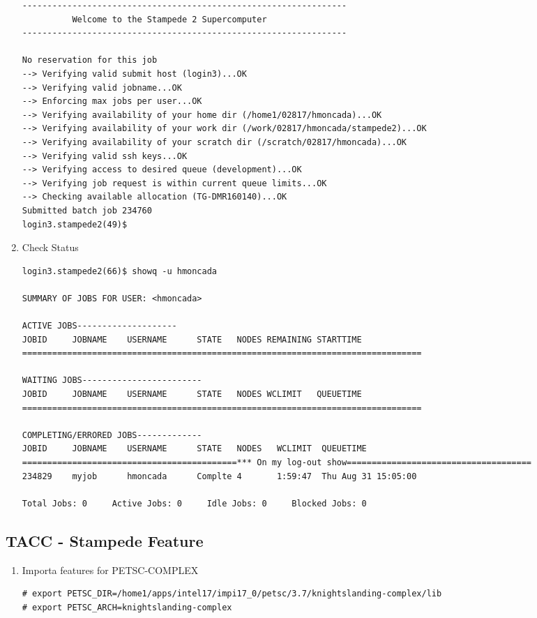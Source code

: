 \documentclass{article}
\begin{document}
\begin{enumerate}
\begin{verbatim}
-----------------------------------------------------------------
          Welcome to the Stampede 2 Supercomputer          
-----------------------------------------------------------------

No reservation for this job
--> Verifying valid submit host (login3)...OK
--> Verifying valid jobname...OK
--> Enforcing max jobs per user...OK
--> Verifying availability of your home dir (/home1/02817/hmoncada)...OK
--> Verifying availability of your work dir (/work/02817/hmoncada/stampede2)...OK
--> Verifying availability of your scratch dir (/scratch/02817/hmoncada)...OK
--> Verifying valid ssh keys...OK
--> Verifying access to desired queue (development)...OK
--> Verifying job request is within current queue limits...OK
--> Checking available allocation (TG-DMR160140)...OK
Submitted batch job 234760
login3.stampede2(49)$ 
\end{verbatim}
\normalsize
\item Check Status
\scriptsize
\begin{verbatim}
login3.stampede2(66)$ showq -u hmoncada

SUMMARY OF JOBS FOR USER: <hmoncada>

ACTIVE JOBS--------------------
JOBID     JOBNAME    USERNAME      STATE   NODES REMAINING STARTTIME
================================================================================

WAITING JOBS------------------------
JOBID     JOBNAME    USERNAME      STATE   NODES WCLIMIT   QUEUETIME
================================================================================

COMPLETING/ERRORED JOBS-------------
JOBID     JOBNAME    USERNAME      STATE   NODES   WCLIMIT  QUEUETIME
===========================================*** On my log-out show=====================================
234829    myjob      hmoncada      Complte 4       1:59:47  Thu Aug 31 15:05:00

Total Jobs: 0     Active Jobs: 0     Idle Jobs: 0     Blocked Jobs: 0 
\end{verbatim}
\normalsize
\end{enumerate}
\subsection{TACC - Stampede Feature}
\begin{enumerate}
\item Importa features for PETSC-COMPLEX
\scriptsize
\begin{verbatim}
# export PETSC_DIR=/home1/apps/intel17/impi17_0/petsc/3.7/knightslanding-complex/lib
# export PETSC_ARCH=knightslanding-complex
\end{verbatim}
\normalsize
\end{enumerate}
\end{document}
